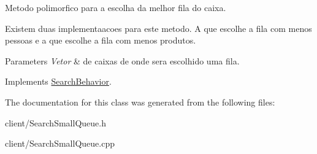 Metodo polimorfico para a escolha da melhor fila do caixa. 

Existem duas implementaacoes para este metodo. A que escolhe a fila com menos pessoas e a que escolhe a fila com menos produtos.


\begin{DoxyParams}{Parameters}
{\em Vetor} & de caixas de onde sera escolhido uma fila. \\
\hline
\end{DoxyParams}


Implements \hyperlink{classSearchBehavior_a89f9439f664a750f08a9877710a0fd9f}{Search\-Behavior}.



The documentation for this class was generated from the following files\-:\begin{DoxyCompactItemize}
\item 
client/Search\-Small\-Queue.\-h\item 
client/Search\-Small\-Queue.\-cpp\end{DoxyCompactItemize}
